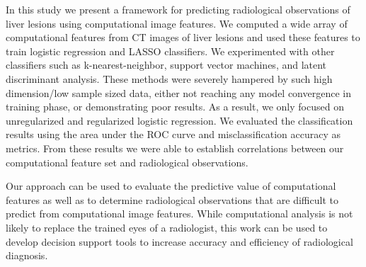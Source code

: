 In this study we present a framework for predicting radiological observations of liver lesions using computational image features. We computed a wide array of computational features from CT images of liver lesions and used these features to train logistic regression and LASSO classifiers. We experimented with other classifiers such as k-nearest-neighbor, support vector machines, and latent discriminant analysis. These methods were severely hampered by such high dimension/low sample sized data, either not reaching any model convergence in training phase, or demonstrating poor results. As a result, we only focused on unregularized and regularized logistic regression. We evaluated the classification results using the area under the ROC curve and misclassification accuracy as metrics. From these results we were able to establish correlations between our computational feature set and radiological observations. 

Our approach can be used to evaluate the predictive value of computational features as well as to determine radiological observations that are difficult to predict from computational image features. While computational analysis is not likely to replace the trained eyes of a radiologist, this work can be used to develop decision support tools to increase accuracy and efficiency of radiological diagnosis.
